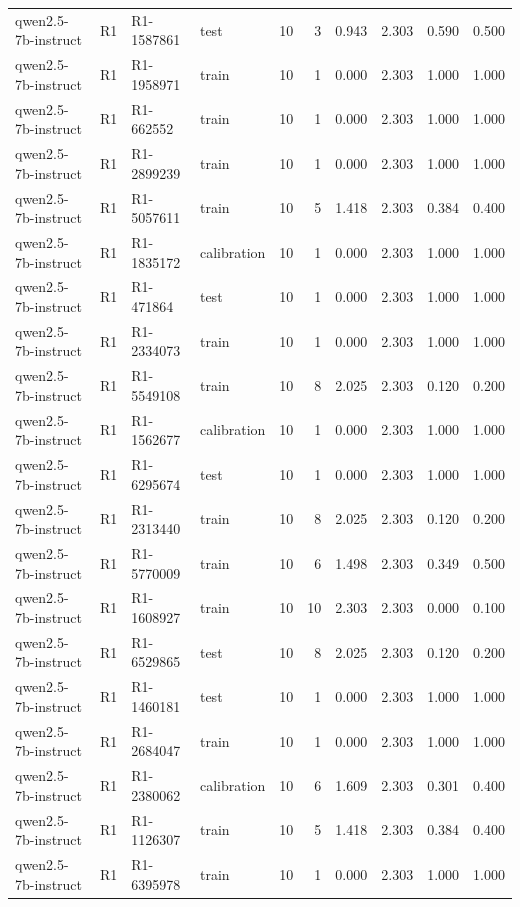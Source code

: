 \begin{table}
\begin{tabular}{llllrrrrrr}
qwen2.5-7b-instruct & R1 & R1-1587861 & test & 10 & 3 & 0.943 & 2.303 & 0.590 & 0.500 \\
qwen2.5-7b-instruct & R1 & R1-1958971 & train & 10 & 1 & 0.000 & 2.303 & 1.000 & 1.000 \\
qwen2.5-7b-instruct & R1 & R1-662552 & train & 10 & 1 & 0.000 & 2.303 & 1.000 & 1.000 \\
qwen2.5-7b-instruct & R1 & R1-2899239 & train & 10 & 1 & 0.000 & 2.303 & 1.000 & 1.000 \\
qwen2.5-7b-instruct & R1 & R1-5057611 & train & 10 & 5 & 1.418 & 2.303 & 0.384 & 0.400 \\
qwen2.5-7b-instruct & R1 & R1-1835172 & calibration & 10 & 1 & 0.000 & 2.303 & 1.000 & 1.000 \\
qwen2.5-7b-instruct & R1 & R1-471864 & test & 10 & 1 & 0.000 & 2.303 & 1.000 & 1.000 \\
qwen2.5-7b-instruct & R1 & R1-2334073 & train & 10 & 1 & 0.000 & 2.303 & 1.000 & 1.000 \\
qwen2.5-7b-instruct & R1 & R1-5549108 & train & 10 & 8 & 2.025 & 2.303 & 0.120 & 0.200 \\
qwen2.5-7b-instruct & R1 & R1-1562677 & calibration & 10 & 1 & 0.000 & 2.303 & 1.000 & 1.000 \\
qwen2.5-7b-instruct & R1 & R1-6295674 & test & 10 & 1 & 0.000 & 2.303 & 1.000 & 1.000 \\
qwen2.5-7b-instruct & R1 & R1-2313440 & train & 10 & 8 & 2.025 & 2.303 & 0.120 & 0.200 \\
qwen2.5-7b-instruct & R1 & R1-5770009 & train & 10 & 6 & 1.498 & 2.303 & 0.349 & 0.500 \\
qwen2.5-7b-instruct & R1 & R1-1608927 & train & 10 & 10 & 2.303 & 2.303 & 0.000 & 0.100 \\
qwen2.5-7b-instruct & R1 & R1-6529865 & test & 10 & 8 & 2.025 & 2.303 & 0.120 & 0.200 \\
qwen2.5-7b-instruct & R1 & R1-1460181 & test & 10 & 1 & 0.000 & 2.303 & 1.000 & 1.000 \\
qwen2.5-7b-instruct & R1 & R1-2684047 & train & 10 & 1 & 0.000 & 2.303 & 1.000 & 1.000 \\
qwen2.5-7b-instruct & R1 & R1-2380062 & calibration & 10 & 6 & 1.609 & 2.303 & 0.301 & 0.400 \\
qwen2.5-7b-instruct & R1 & R1-1126307 & train & 10 & 5 & 1.418 & 2.303 & 0.384 & 0.400 \\
qwen2.5-7b-instruct & R1 & R1-6395978 & train & 10 & 1 & 0.000 & 2.303 & 1.000 & 1.000 \\

\end{tabular}
\end{table}
